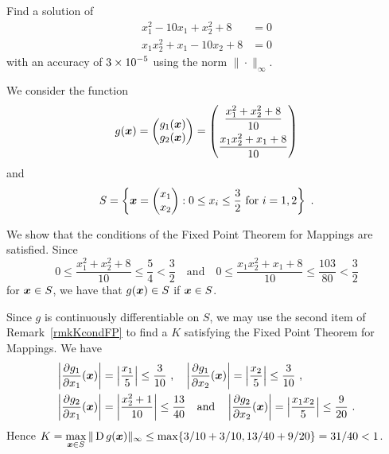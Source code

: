 \begin{egg}
Find a solution of
\begin{align*}
x_1^2 - 10x_1 +x_2^2 + 8 &= 0\\
x_1x_2^2 + x_1 -10x_2+8 &= 0
\end{align*}
with an accuracy of $\displaystyle 3 \times 10^{-5}$ using the norm
$\|\cdot\|_\infty$.

We consider the function
\[
g(\bm{x}) = \begin{pmatrix}
g_1(\bm{x}) \\ g_2(\bm{x})
\end{pmatrix} = \begin{pmatrix}
\displaystyle \frac{x_1^2 + x_2^2 +8}{10} \\[0.7em]
\displaystyle \frac{x_1x_2^2 +x_1 +8}{10}
\end{pmatrix}
\]
and
\[
S = \left\{ \bm{x} = \begin{pmatrix}
x_1 \\ x_2
\end{pmatrix} : 0 \leq x_i \leq \frac{3}{2} \text{ for } i=1,2 \right\} \ .
\]

We show that the conditions of the Fixed Point Theorem for Mappings are
satisfied.  Since
\[
0 \leq \frac{x_1^2 + x_2^2 + 8}{10} \leq \frac{5}{4} < \frac{3}{2}
\quad \text{and} \quad
0 \leq \frac{x_1x_2^2 + x_1 +8}{10} \leq \frac{103}{80} < \frac{3}{2}
\]
for $\bm{x} \in S$, we have that $g(\bm{x}) \in S$ if
$\bm{x} \in S$.

Since $g$ is continuously differentiable on $S$, we may use the
second item of Remark~\ref{rmkKcondFP} to find a $K$ satisfying the
Fixed Point Theorem for Mappings.  We have
\begin{align*}
\left| \frac{\partial{g_1}}{\partial{x_1}}(\bm{x}) \right| &=
\left| \frac{x_1}{5} \right| \leq \frac{3}{10} \ , \quad
\left| \frac{\partial{g_1}}{\partial{x_2}}(\bm{x}) \right| =
\left| \frac{x_2}{5}\right| \leq \frac{3}{10} \ , \\
\left| \frac{\partial{g_2}}{\partial{x_1}}(\bm{x}) \right| &=
\left| \frac{x_2^2+1}{10}\right| \leq \frac{13}{40} \quad \text{and}
\quad
\left| \frac{\partial{g_2}}{\partial{x_2}}(\bm{x}) \right| =
\left| \frac{x_1 x_2}{5}\right| \leq \frac{9}{20} \ .
\end{align*}
Hence $\displaystyle K = \max_{\bm{x} \in S} \|\operatorname{D} g(\bm{x})\|_\infty \leq
\max\{3/10 + 3/10,13/40 + 9/20\} = 31/40 <1$.


\end{egg}
